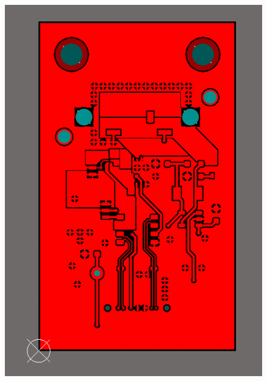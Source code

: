 \documentclass[a4paper,11pt]{article}
\begin{document}
\begin{figure}[htbp]
\centering
\includegraphics[scale=0.5]{PulserBoard0.9TopLayer.png}
\qquad

\end{figure}
\end{document}
